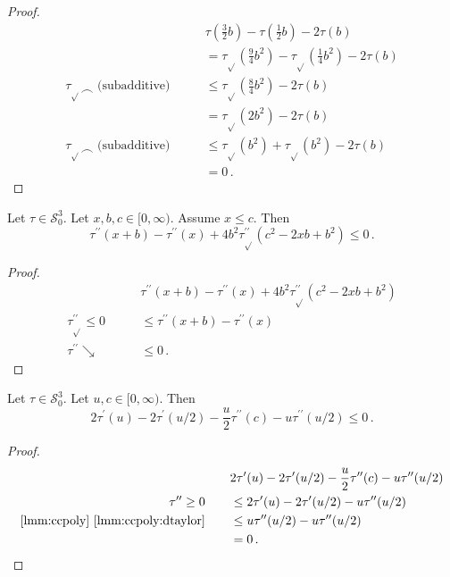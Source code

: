 \documentclass{article}
\newcommand*{\mc}[1]{\mathcal{#1}}
\newcommand{\Rp}{[0, \infty)} %
\newcommand{\pr}{^\prime}
\newcommand{\prr}{^{\prime\prime}}
\newcommand{\equationFullstop}{\, .}
\newcommand{\eqfs}{\equationFullstop}
\newcommand{\tran}{\tau}
\newcommand{\trans}{\tran_{\!\sqrt{}}}
\newcommand{\ddtrans}{\trans\prr}
\newcommand{\dtran}{\tran\pr}
\newcommand{\ddtran}{\tran\prr}
\newcommand{\setccod}[1]{\mc S_0^{#1}}
\newcommand{\decr}{\searrow}
\newcommand{\posi}{\geq0}
\newcommand{\nega}{\leq0}
\newcommand{\conc}{\smallfrown}
\begin{document}
\begin{appendix}
\begin{proof}
\begin{align*}
		&\tran(\frac32 b) - \tran(\frac 12 b) - 2 \tran(b)
		\\
		\qquad&=
		\trans(\frac94 b^2) - \trans(\frac 14 b^2) - 2 \tran(b)
		\\
		\trans\conc\text{ (subadditive)}
		\qquad&\leq
		\trans(\frac84 b^2) - 2 \tran(b)
		\\
		\qquad&=
		\trans(2 b^2) - 2 \tran(b)
		\\
		\trans\conc\text{ (subadditive)}
		\qquad&\leq
		\trans(b^2) + \trans(b^2) - 2 \tran(b)
		\\
		\qquad&=
		0
		\eqfs
	\end{align*}
\end{proof}
%
%
%
\begin{lemma}\label{mech:14}
	Let $\tran\in\setccod3$.
	Let $x,b,c\in\Rp$.
	Assume $x \leq c$.
	Then
	\begin{equation*}
		\ddtran(x+b) - \ddtran(x) + 4 b^2\ddtrans(c^2 - 2 x b + b^2)
		\leq
		0
		\eqfs
	\end{equation*}
\end{lemma}
%
\begin{proof}
	\begin{align*}
		&
		\ddtran(x+b) - \ddtran(x) + 4 b^2\ddtrans(c^2 - 2 x b + b^2)
		\\
		\ddtrans\nega
		\qquad&\leq
		\ddtran(x+b) - \ddtran(x)
		\\
		\ddtran\decr
		\qquad&\leq
		0
		\eqfs
	\end{align*}
\end{proof}
%
%
%
\begin{lemma}\label{mech:15}
	Let $\tran\in\setccod3$.
	Let $u,c\in\Rp$.
	Then
	\begin{equation*}
		2\dtran(u)
		- 2\dtran(u/2)
		- \frac u2 \ddtran(c)
		- u\ddtran(u/2)
		\leq
		0
		\eqfs
	\end{equation*}
\end{lemma}
%
\begin{proof}
	\begin{align*}
		&
		2\dtran(u)
		- 2\dtran(u/2)
		- \frac u2\ddtran(c)
		- u\ddtran(u/2)
		\\
		\ddtran\posi
		\qquad&\leq
		2\dtran(u)
		- 2\dtran(u/2)
		- u\ddtran(u/2)
		\\
		\text{\cref{lmm:ccpoly} \ref{lmm:ccpoly:dtaylor}}
		\qquad&\leq
		u \ddtran(u/2)
		-
		u \ddtran(u/2)
		\\
		\qquad&=
		0
		\eqfs
	\end{align*}
\end{proof}
%
%
%
%
\begin{lemma}\label{mech:16}

\end{lemma}
\end{appendix}
\end{document}

